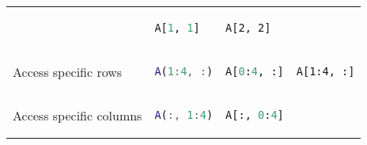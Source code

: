 \documentclass[10pt, landscape]{article}
\begin{document}
\begin{multicols}{2}
\begin{tabular}[]{@{}llll@{}}
\begin{minipage}[t]{0.23\columnwidth}
\end{minipage} & \begin{minipage}[t]{0.23\columnwidth}\raggedright
\begin{lstlisting}[language=Python]
A[1, 1]
\end{lstlisting}

\end{minipage} & \begin{minipage}[t]{0.20\columnwidth}\raggedright
\begin{lstlisting}
A[2, 2]
\end{lstlisting}

\end{minipage}\tabularnewline
\begin{minipage}[t]{0.23\columnwidth}\raggedright
Access specific rows
\end{minipage} & \begin{minipage}[t]{0.23\columnwidth}\raggedright
\begin{lstlisting}[language=Matlab]
A(1:4, :)
\end{lstlisting}

\end{minipage} & \begin{minipage}[t]{0.23\columnwidth}\raggedright
\begin{lstlisting}[language=Python]
A[0:4, :]
\end{lstlisting}

\end{minipage} & \begin{minipage}[t]{0.20\columnwidth}\raggedright
\begin{lstlisting}
A[1:4, :]
\end{lstlisting}

\end{minipage}\tabularnewline
\begin{minipage}[t]{0.23\columnwidth}\raggedright
Access specific columns
\end{minipage} & \begin{minipage}[t]{0.23\columnwidth}\raggedright
\begin{lstlisting}[language=Matlab]
A(:, 1:4)
\end{lstlisting}

\end{minipage} & \begin{minipage}[t]{0.23\columnwidth}\raggedright
\begin{lstlisting}[language=Python]
A[:, 0:4]
\end{lstlisting}


\end{minipage}
\end{tabular}
\end{multicols}
\end{document}
